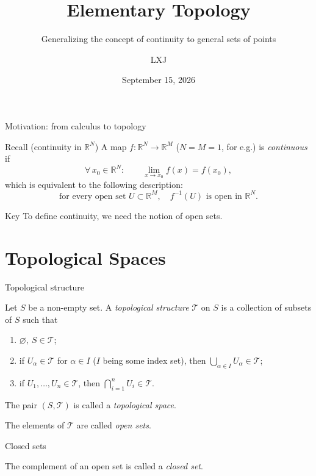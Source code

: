 \documentclass[10pt]{beamer}
\title{Elementary Topology}
\subtitle{Generalizing the concept of continuity to general sets of points}
\date{September 15, 2026}
\author{LXJ}
\newcommand{\R}{\mathbb{R}}
\newcommand{\T}{\mathcal{T}}
\begin{document}
\maketitle

\begin{frame}{Motivation: from calculus to topology}
	\begin{block}{Recall (continuity in $\R^N$)}
		A map $f:\R^N \to \R^M$ ($N=M=1$, for e.g.) is \emph{continuous} if
		\[
			\forall\, x_0 \in \R^N:\qquad \lim_{x \to x_0} f(x) = f(x_0),
		\]
		which is equivalent to the following description:
		\[
			\text{for every open set } U \subset \R^M,\quad f^{-1}(U) \text{ is open in } \R^N.
		\]
	\end{block}
	\begin{alertblock}{Key}
		To define continuity, we need the notion of \alert{open sets}.
	\end{alertblock}
\end{frame}

\section{Topological Spaces}

\begin{frame}{Topological structure}
	\begin{definition}
		Let $S$ be a non-empty set. A \emph{topological structure} $\T$ on $S$ is a
		collection of subsets of $S$ such that
		\begin{enumerate}
			\item $\varnothing,\ S \in \T$;
			\item if $U_\alpha \in \T$ for $\alpha \in I$ ($I$ being some index set),
			      then $\displaystyle\bigcup_{\alpha \in I} U_\alpha \in \T$;
			\item if $U_1, \dots, U_n \in \T$, then
			      $\displaystyle\bigcap_{i=1}^{n} U_i \in \T$.
		\end{enumerate}
		The pair $(S,\T)$ is called a \emph{topological space}.
	\end{definition}
	The elements of $\T$ are called \emph{open sets}.
\end{frame}

\begin{frame}{Closed sets}
	\begin{definition}
		The complement of an open set is called a \emph{closed set}.
	\end{definition}
\end{frame}
\end{document}
